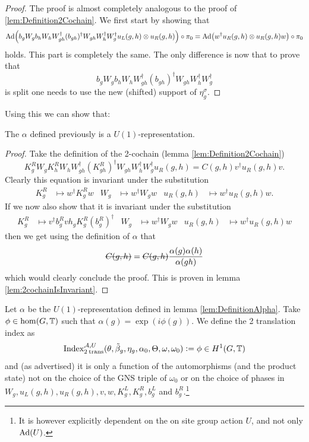\documentclass[12pt,a4paper,twoside]{article}
\numberwithin{equation}{section}
\begin{document}
\begin{proof}
The proof is almost completely analogous to the proof of \ref{lem:Definition2Cochain}. We first start by showing that
\begin{equation}
\Ad{b_g W_g b_h W_h W_{gh}^\dagger (b_{gh})^\dagger W_{gh}W_h^\dagger W_g^\dagger u_L(g,h)\otimes u_R(g,h)}\circ\pi_0=\Ad{w^\dagger u_R(g,h)\otimes u_R(g,h) w}\circ\pi_0
\end{equation}
holds. This part is completely the same. The only difference is now that to prove that
\begin{equation}
b_g W_g b_h W_h W_{gh}^\dagger (b_{gh})^\dagger W_{gh}W_h^\dagger W_g^\dagger
\end{equation}
 is split one needs to use the new (shifted) support of $\eta_g^\sigma$.
\end{proof}
Using this we can show that:
\begin{lemma}
	The $\alpha$ defined previously is a $U(1)$-representation.
\end{lemma}
\begin{proof}
	Take the definition of the 2-cochain (lemma \ref{lem:Definition2Cochain})
	\begin{equation}\label{eq:Definition2Cochain2TranslationSection}
		K_g^RW_gK_h^RW_hW_{gh}^\dagger(K_{gh}^R)^\dagger W_{gh}W_{h}^\dagger W_g^\dagger u_R(g,h)=C(g,h)v^\dagger u_R(g,h)v.
	\end{equation}
	Clearly this equation is invariant under the substitution
	\begin{align}
		K_g^R&\mapsto w^\dagger K_g^R w&W_g&\mapsto w^\dagger W_g w&u_R(g,h)&\mapsto w^\dagger u_R(g,h)w.
	\end{align}
	If we now also show that it is invariant under the substitution
	\begin{align}
		K_g^R&\mapsto v^\dagger b_g^R v h_g K_g^R (b_g^R)^\dagger&W_g&\mapsto w^\dagger W_g w&u_R(g,h)&\mapsto w^\dagger u_R(g,h)w
	\end{align}
	then we get using the definition of $\alpha$ that
	\begin{equation}
		\stkout{C(g,h)}=\stkout{C(g,h)}\frac{\alpha(g)\alpha(h)}{\alpha(gh)}
	\end{equation}
	which would clearly conclude the proof. This is proven in lemma \ref{lem:2cochainIsInvariant}.
\end{proof}
\begin{definition}
	Let $\alpha$ be the $U(1)$-representation defined in lemma \ref{lem:DefinitionAlpha}. Take $\phi\in\hom(G,\mathbb T)$ such that $\alpha(g)=\exp(i\phi(g))$. We define the 2 translation index as
	\begin{equation}
		\textrm{Index}_{2\:\text{trans}}^{\mathcal A,U}(\theta,\tilde{\beta}_g,\eta_g,\alpha_0,\Theta,\omega,\omega_0)\vcentcolon= \phi\in H^1(G,\mathbb T)
	\end{equation}
	and (as advertised) it is only a function of the automorphisms (and the product state) not on the choice of the GNS triple of $\omega_0$ or on the choice of phases in $W_g,u_L(g,h),u_R(g,h),v,w,K^L_g,K^R_g,b^L_g$ and $b^R_g$.\footnote{It is however explicitly dependent on the on site group action $U$, and not only $\Ad{U}$.}
\end{definition}
\end{document}
